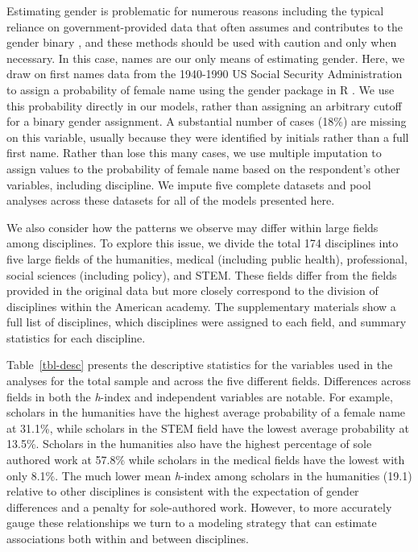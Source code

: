 \documentclass[
  10pt,
  letterpaper,
]{article}
\begin{document}
Estimating gender is problematic for numerous reasons including the
typical reliance on government-provided data that often assumes and
contributes to the gender binary \citep{mihaljevic_reflections_2019},
and these methods should be used with caution and only when necessary.
In this case, names are our only means of estimating gender. Here, we
draw on first names data from the 1940-1990 US Social Security
Administration to assign a probability of female name using the gender
package in R \citep{blevins_jane_2015}. We use this probability directly
in our models, rather than assigning an arbitrary cutoff for a binary
gender assignment. A substantial number of cases (18\%) are missing on
this variable, usually because they were identified by initials rather
than a full first name. Rather than lose this many cases, we use
multiple imputation to assign values to the probability of female name
based on the respondent's other variables, including discipline. We
impute five complete datasets and pool analyses across these datasets
for all of the models presented here.

We also consider how the patterns we observe may differ within large
fields among disciplines. To explore this issue, we divide the total 174
disciplines into five large fields of the humanities, medical (including
public health), professional, social sciences (including policy), and
STEM. These fields differ from the fields provided in the original data
but more closely correspond to the division of disciplines within the
American academy. The supplementary materials show a full list of
disciplines, which disciplines were assigned to each field, and summary
statistics for each discipline.

Table~\ref{tbl-desc} presents the descriptive statistics for the
variables used in the analyses for the total sample and across the five
different fields. Differences across fields in both the \emph{h}-index
and independent variables are notable. For example, scholars in the
humanities have the highest average probability of a female name at
31.1\%, while scholars in the STEM field have the lowest average
probability at 13.5\%. Scholars in the humanities also have the highest
percentage of sole authored work at 57.8\% while scholars in the medical
fields have the lowest with only 8.1\%. The much lower mean
\emph{h}-index among scholars in the humanities (19.1) relative to other
disciplines is consistent with the expectation of gender differences and
a penalty for sole-authored work. However, to more accurately gauge
these relationships we turn to a modeling strategy that can estimate
associations both within and between disciplines.
\end{document}
